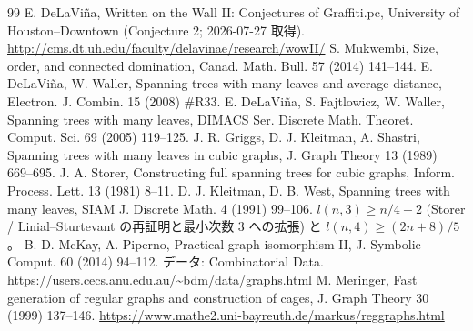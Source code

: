 \documentclass[paper=a4,fontsize=10.5pt,jafontsize=10.5pt]{jlreq}
\theoremstyle{plain}
\theoremstyle{definition}
\begin{document}
\begin{thebibliography}{99}
 E. DeLaViña, Written on the Wall II: Conjectures of Graffiti.pc, University of Houston--Downtown (Conjecture 2; 2026-07-27 取得). \url{http://cms.dt.uh.edu/faculty/delavinae/research/wowII/}
 S. Mukwembi, Size, order, and connected domination, Canad. Math. Bull. 57 (2014) 141--144.
 E. DeLaViña, W. Waller, Spanning trees with many leaves and average distance, Electron. J. Combin. 15 (2008) \#R33.
 E. DeLaViña, S. Fajtlowicz, W. Waller, Spanning trees with many leaves, DIMACS Ser. Discrete Math. Theoret. Comput. Sci. 69 (2005) 119--125.
 J. R. Griggs, D. J. Kleitman, A. Shastri, Spanning trees with many leaves in cubic graphs, J. Graph Theory 13 (1989) 669--695.
 J. A. Storer, Constructing full spanning trees for cubic graphs, Inform. Process. Lett. 13 (1981) 8--11.
 D. J. Kleitman, D. B. West, Spanning trees with many leaves, SIAM J. Discrete Math. 4 (1991) 99--106. $l(n,3) \ge n/4 + 2$ (Storer / Linial--Sturtevant の再証明と最小次数 3 への拡張) と $l(n,4) \ge (2n+8)/5$。
 B. D. McKay, A. Piperno, Practical graph isomorphism II, J. Symbolic Comput. 60 (2014) 94--112. データ: Combinatorial Data. \url{https://users.cecs.anu.edu.au/~bdm/data/graphs.html}
 M. Meringer, Fast generation of regular graphs and construction of cages, J. Graph Theory 30 (1999) 137--146. \url{https://www.mathe2.uni-bayreuth.de/markus/reggraphs.html}
\end{thebibliography}
\end{document}

